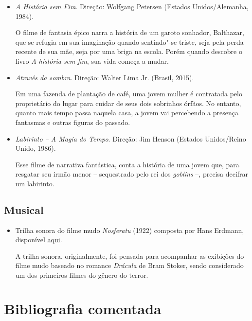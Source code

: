 \documentclass[12pt]{extarticle}
\begin{document}
\begin{itemize}
\item \textit{A História sem Fim}. Direção: Wolfgang Petersen (Estados Unidos/Alemanha, 1984).

O filme de fantasia épico narra a história de um garoto sonhador, Balthazar, que se refugia 
em sua imaginação quando sentindo"-se triste, seja pela perda recente de sua mãe, seja por 
uma briga na escola. Porém quando descobre o livro \emph{A história sem fim}, sua vida começa 
a mudar. 

\item \textit{Através da sombra}. Direção: Walter Lima Jr. (Brasil, 2015).

Em uma fazenda de plantação de café, uma jovem mulher é contratada pelo proprietário do lugar para 
cuidar de seus dois sobrinhos órfãos. No entanto, quanto mais tempo passa naquela casa, a jovem vai 
percebendo a presença fantasmas e outras figuras do passado.

\item \textit{Labirinto – A Magia do Tempo}. Direção: Jim Henson (Estados Unidos/Reino Unido, 1986).

Esse filme de narrativa fantástica, conta a história de uma jovem que, para resgatar seu irmão 
menor -- sequestrado pelo rei dos \emph{goblins} --, precisa decifrar um labirinto.
\end{itemize}

\subsection{Musical}

\begin{itemize}
\item Trilha sonora do filme mudo \emph{Nosferatu} (1922) composta por Hans Erdmann, disponível \href{https://www.youtube.com/watch?v=NcH38cHjxoM&list=PL8719CBB5D13FFBCA&ab_channel=Billena}{aqui}.

A trilha sonora, originalmente, foi pensada para acompanhar as exibições do filme mudo baseado 
no romance \emph{Drácula} de Bram Stoker, sendo considerado um dos primeiros filmes do gênero do 
terror.
\end{itemize}

\section{Bibliografia comentada}
\end{document}

